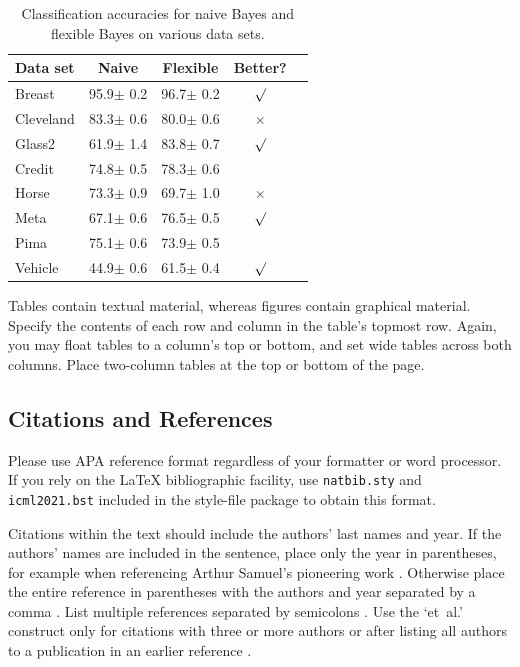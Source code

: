 \documentclass{article}
\begin{document}

\begin{table}[t]
\caption{Classification accuracies for naive Bayes and flexible
Bayes on various data sets.}
\label{sample-table}
\vskip 0.15in
\begin{center}
\begin{small}
\begin{sc}
\begin{tabular}{lcccr}
\toprule
Data set & Naive & Flexible & Better? \\
\midrule
Breast    & 95.9$\pm$ 0.2& 96.7$\pm$ 0.2& $\surd$ \\
Cleveland & 83.3$\pm$ 0.6& 80.0$\pm$ 0.6& $\times$\\
Glass2    & 61.9$\pm$ 1.4& 83.8$\pm$ 0.7& $\surd$ \\
Credit    & 74.8$\pm$ 0.5& 78.3$\pm$ 0.6&         \\
Horse     & 73.3$\pm$ 0.9& 69.7$\pm$ 1.0& $\times$\\
Meta      & 67.1$\pm$ 0.6& 76.5$\pm$ 0.5& $\surd$ \\
Pima      & 75.1$\pm$ 0.6& 73.9$\pm$ 0.5&         \\
Vehicle   & 44.9$\pm$ 0.6& 61.5$\pm$ 0.4& $\surd$ \\
\bottomrule
\end{tabular}
\end{sc}
\end{small}
\end{center}
\vskip -0.1in
\end{table}

Tables contain textual material, whereas figures contain graphical material.
Specify the contents of each row and column in the table's topmost
row. Again, you may float tables to a column's top or bottom, and set
wide tables across both columns. Place two-column tables at the
top or bottom of the page.

\subsection{Citations and References}

Please use APA reference format regardless of your formatter
or word processor. If you rely on the \LaTeX\/ bibliographic
facility, use \texttt{natbib.sty} and \texttt{icml2021.bst}
included in the style-file package to obtain this format.

Citations within the text should include the authors' last names and
year. If the authors' names are included in the sentence, place only
the year in parentheses, for example when referencing Arthur Samuel's
pioneering work . Otherwise place the entire
reference in parentheses with the authors and year separated by a
comma \cite{Samuel59}. List multiple references separated by
semicolons \cite{kearns89,Samuel59,mitchell80}. Use the `et~al.'
construct only for citations with three or more authors or after
listing all authors to a publication in an earlier reference \cite{MachineLearningI}.
\end{document}
